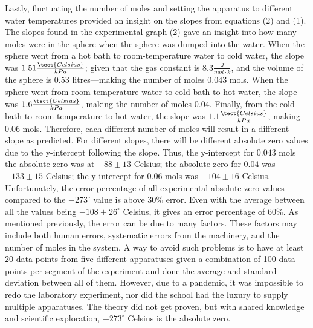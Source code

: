 \documentclass[11pt]{article}
\begin{document}
Lastly, fluctuating the number of moles and setting the apparatus to different water temperatures provided an insight on the slopes from equations (2) and (1). The slopes found in the experimental graph (2) gave an insight into how many moles were in the sphere when the sphere was dumped into the water. When the sphere went from a hot bath to room-temperature water to cold water, the slope was $1.51 \frac{\tect{Celsius}}{kPa}$; given that the gas constant is $8.3 \frac{J}{mol\cdot k}$, and the volume of the sphere is $0.53$ litres—making the number of moles 0.043 mols. When the sphere went from room-temperature water to cold bath to hot water, the slope was $1.6 \frac{\tect{Celsius}}{kPa}$, making the number of moles $0.04$. Finally, from the cold bath to room-temperature to hot water, the slope was $1.1 \frac{\tect{Celsius}}{kPa}$, making 0.06 mols. Therefore, each different number of moles will result in a different slope as predicted. For different slopes, there will be different absolute zero values due to the y-intercept following the slope. Thus, the y-intercept for $0.043$ mols the absolute zero was at $-88\pm13$ Celsius; the absolute zero for $0.04$ was $-133\pm15$ Celsius; the y-intercept for $0.06$ mols was $-104\pm16$ Celsius. Unfortunately, the error percentage of all experimental absolute zero values compared to the $-273^\circ$ value is above $30\%$ error. Even with the average between all the values being $-108\pm26^\circ$ Celsius, it gives an error percentage of $60\%$. As mentioned previously, the error can be due to many factors. These factors may include both human errors, systematic errors from the machinery, and the number of moles in the system. A way to avoid such problems is to have at least 20 data points from five different apparatuses given a combination of 100 data points per segment of the experiment and done the average and standard deviation between all of them. However, due to a pandemic, it was impossible to redo the laboratory experiment, nor did the school had the luxury to supply multiple apparatuses. The theory did not get proven, but with shared knowledge and scientific exploration, $-273^\circ$ Celsius is the absolute zero. 

\newpage
\end{document}
